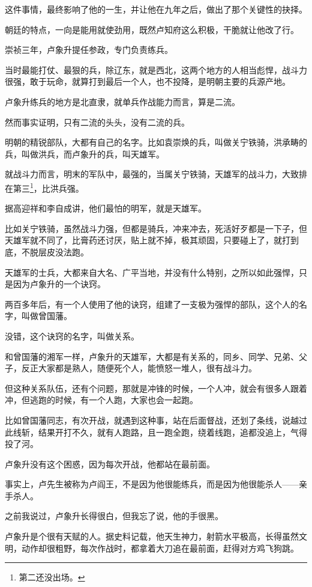 \begin{multicols}{\theparacolNo}
		这件事情，最终影响了他的一生，并让他在九年之后，做出了那个关键性的抉择。

		朝廷的特点，一向是能用就使劲用，既然卢知府这么积极，干脆就让他改了行。

		崇祯三年，卢象升提任参政，专门负责练兵。

		当时最能打仗、最狠的兵，除辽东，就是西北，这两个地方的人相当彪悍，战斗力很强，敢于玩命，就算打到最后一个人，也不投降，是明朝主要的兵源产地。

		卢象升练兵的地方是北直隶，就单兵作战能力而言，算是二流。

		然而事实证明，只有二流的头头，没有二流的兵。

		明朝的精锐部队，大都有自己的名字。比如袁崇焕的兵，叫做关宁铁骑，洪承畴的兵，叫做洪兵，而卢象升的兵，叫天雄军。

		就战斗力而言，明末的军队中，最强的，当属关宁铁骑，天雄军的战斗力，大致排在第三\footnote{第二还没出场。}，比洪兵强。

		据高迎祥和李自成讲，他们最怕的明军，就是天雄军。

		比如关宁铁骑，虽然战斗力强，但都是骑兵，冲来冲去，死活好歹都是一下子，但天雄军就不同了，比膏药还讨厌，贴上就不掉，极其顽固，只要碰上了，就打到底，不脱层皮没法跑。

		天雄军的士兵，大都来自大名、广平当地，并没有什么特别，之所以如此强悍，只是因为卢象升的一个诀窍。

		两百多年后，有一个人使用了他的诀窍，组建了一支极为强悍的部队，这个人的名字，叫做曾国藩。

		没错，这个诀窍的名字，叫做关系。

		和曾国藩的湘军一样，卢象升的天雄军，大都是有关系的，同乡、同学、兄弟、父子，反正大家都是熟人，随便死个人，能愤怒一堆人，很有战斗力。

		但这种关系队伍，还有个问题，那就是冲锋的时候，一个人冲，就会有很多人跟着冲，但逃跑的时候，有一个人跑，大家也会一起跑。

		比如曾国藩同志，有次开战，就遇到这种事，站在后面督战，还划了条线，说越过此线斩，结果开打不久，就有人跑路，且一跑全跑，绕着线跑，追都没追上，气得投了河。

		卢象升没有这个困惑，因为每次开战，他都站在最前面。

		事实上，卢先生被称为卢阎王，不是因为他很能练兵，而是因为他很能杀人——亲手杀人。

		之前我说过，卢象升长得很白，但我忘了说，他的手很黑。

		卢象升是个很有天赋的人。据史料记载，他天生神力，射箭水平极高，长得虽然文明，动作却很粗野，每次作战时，都拿着大刀追在最前面，赶得对方鸡飞狗跳。


\end{multicols}

